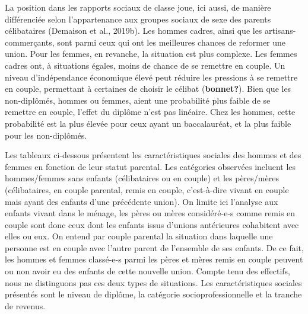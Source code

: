 \documentclass[
  12pt,
]{book}
\begin{document}
La position dans les rapports sociaux de classe joue, ici aussi, de
manière différenciée selon l'appartenance aux groupes sociaux de sexe
des parents célibataires (Demaison et al., 2019b). Les hommes cadres,
ainsi que les artisans-commerçants, sont parmi ceux qui ont les
meilleures chances de reformer une union. Pour les femmes, en revanche,
la situation est plus complexe. Les femmes cadres ont, à situations
égales, moins de chance de se remettre en couple. Un niveau
d'indépendance économique élevé peut réduire les pressions à se remettre
en couple, permettant à certaines de choisir le célibat
(\textbf{bonnet?}). Bien que les non-diplômés, hommes ou femmes, aient
une probabilité plus faible de se remettre en couple, l'effet du diplôme
n'est pas linéaire. Chez les hommes, cette probabilité est la plus
élevée pour ceux ayant un baccalauréat, et la plus faible pour les
non-diplômés.

Les tableaux ci-dessous présentent les caractéristiques sociales des
hommes et des femmes en fonction de leur statut parental. Les catégories
observées incluent les hommes/femmes sans enfants (célibataires ou en
couple) et les pères/mères (célibataires, en couple parental, remis en
couple, c'est-à-dire vivant en couple mais ayant des enfants d'une
précédente union). On limite ici l'analyse aux enfants vivant dans le
ménage, les pères ou mères considéré-e-s comme remis en couple sont donc
ceux dont les enfants issus d'unions antérieures cohabitent avec elles
ou eux. On entend par couple parental la situation dans laquelle une
personne est en couple avec l'autre parent de l'ensemble de ses enfants.
De ce fait, les hommes et femmes classé-e-s parmi les pères et mères
remis en couple peuvent ou non avoir eu des enfants de cette nouvelle
union. Compte tenu des effectifs, nous ne distinguons pas ces deux types
de situations. Les caractéristiques sociales présentés sont le niveau de
diplôme, la catégorie socioprofessionnelle et la tranche de revenus.
\end{document}
